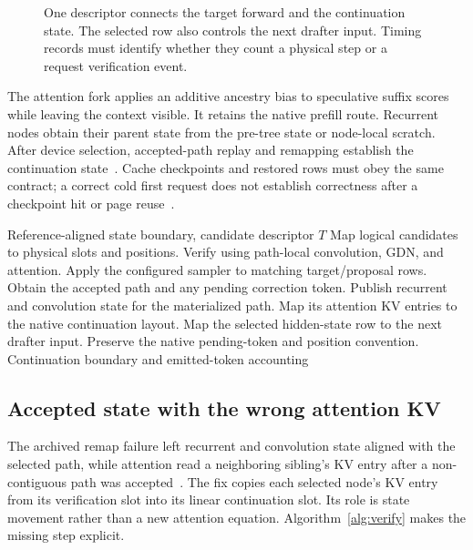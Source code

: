 \documentclass[conference]{IEEEtran}
\begin{document}
\begin{figure}[t]
\centering

\caption{One descriptor connects the target forward and the continuation state. The selected row also controls the next drafter input. Timing records must identify whether they count a physical step or a request verification event.}
\label{fig:pipeline}
\end{figure}

The attention fork applies an additive ancestry bias to speculative suffix scores while leaving the context visible. It retains the native prefill route. Recurrent nodes obtain their parent state from the pre-tree state or node-local scratch. After device selection, accepted-path replay and remapping establish the continuation state~\cite{lumo2026receipts}. Cache checkpoints and restored rows must obey the same contract; a correct cold first request does not establish correctness after a checkpoint hit or page reuse~\cite{lumo2026stateless}.

\begin{algorithm}[t]
\caption{Logical verifier and continuation boundary}
\label{alg:verify}
\begin{algorithmic}[1]
\REQUIRE Reference-aligned state boundary, candidate descriptor $T$
\STATE Map logical candidates to physical slots and positions.
\STATE Verify using path-local convolution, GDN, and attention.
\STATE Apply the configured sampler to matching target/proposal rows.
\STATE Obtain the accepted path and any pending correction token.
\STATE Publish recurrent and convolution state for the materialized path.
\STATE Map its attention KV entries to the native continuation layout.
\STATE Map the selected hidden-state row to the next drafter input.
\STATE Preserve the native pending-token and position convention.
\RETURN Continuation boundary and emitted-token accounting
\end{algorithmic}
\end{algorithm}

\subsection{Accepted state with the wrong attention KV}
The archived remap failure left recurrent and convolution state aligned with the selected path, while attention read a neighboring sibling's KV entry after a non-contiguous path was accepted~\cite{lumo2026stateless}. The fix copies each selected node's KV entry from its verification slot into its linear continuation slot. Its role is state movement rather than a new attention equation. Algorithm~\ref{alg:verify} makes the missing step explicit.
\end{document}
